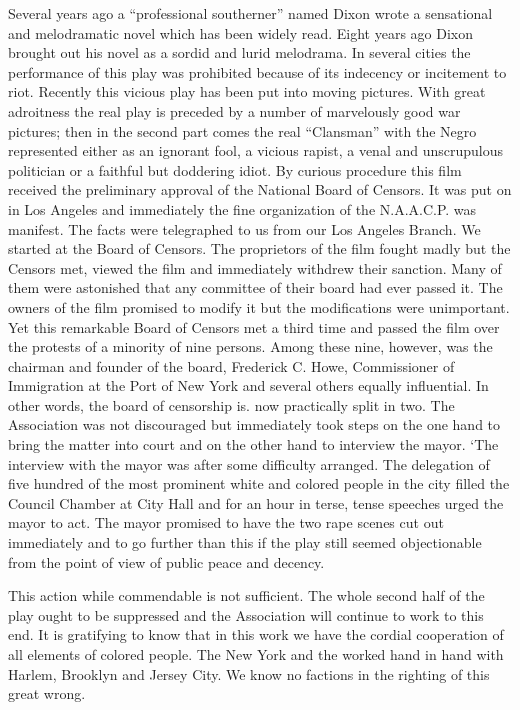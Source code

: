 \documentclass[letterpaper,10pt,english]{jupyterBook}
\begin{document}
\sphinxAtStartPar
Several years ago a “professional southerner” named Dixon wrote a sensational and melodramatic novel which has been widely read. Eight years ago Dixon brought out his novel as a sordid and lurid melodrama. In several cities the performance of this play was prohibited because of its indecency or incitement to riot. Recently this vicious play has been put into moving pictures. With great adroitness the real play is preceded by a number of marvelously good war pictures; then in the second part comes the real “Clansman” with the Negro represented either as an ignorant fool, a vicious rapist, a venal and unscrupulous politician or a faithful but doddering idiot. By curious procedure this film received the preliminary approval of the National Board of Censors. It was put on in Los Angeles and immediately the fine organization of the N.A.A.C.P. was manifest. The facts were telegraphed to us from our Los Angeles Branch. We started at the Board of Censors. The proprietors of the film fought madly but the Censors met, viewed the film and immediately withdrew their sanction. Many of them were astonished that any committee of their board had ever passed it. The owners of the film promised to modify it but the modifications were unimportant. Yet this remarkable Board of Censors met a third time and passed the film over the protests of a minority of nine persons. Among these nine, however, was the chairman and founder of the board, Frederick C. Howe, Commissioner of Immigration at the Port of New York and several others equally influential. In other words, the board of censorship is. now practically split in two. The Association was not discouraged but immediately took steps on the one hand to bring the matter into court and on the other hand to interview the mayor. ‘The interview with the mayor was after some difficulty arranged. The delegation of five hundred of the most prominent white and colored people in the city filled the Council Chamber at City Hall and for an hour in terse, tense speeches urged the mayor to act. The mayor promised to have the two rape scenes cut out immediately and to go further than this if the play still seemed objectionable from the point of view of public peace and decency.

\sphinxAtStartPar
This action while commendable is not sufficient. The whole second half of the play ought to be suppressed and the Association will continue to work to this end. It is gratifying to know that in this work we have the cordial co\sphinxhyphen{}operation of all elements of colored people. The New York  and the  worked hand in hand with Harlem, Brooklyn and Jersey City. We know no factions in the righting of this great wrong.
\end{document}

